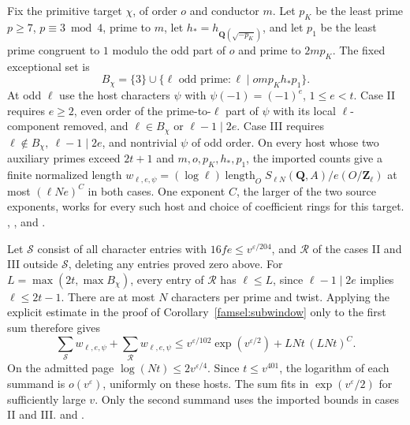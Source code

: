 Fix the primitive target \(\chi\), of order \(o\) and conductor \(m\).
Let \(p_K\) be the least prime \(p\ge7\), \(p\equiv3\bmod4\), prime
to \(m\), let \(h_* = h_{\mathbf Q(\sqrt{-p_K})}\), and let \(p_1\)
be the least prime congruent to \(1\) modulo the odd part of \(o\)
and prime to \(2mp_K\). The fixed exceptional set is
\[
 B_\chi=\{3\}\cup\{\ell\text{ odd prime}:\ell\mid om p_K h_*p_1\}.
\]
At odd \(\ell\) use the host characters \(\psi\) with
\(\psi(-1)=(-1)^e\), \(1\le e<t\). Case II requires \(e\ge2\), even
order of the prime-to-\(\ell\) part of \(\psi\) with its local
\(\ell\)-component removed, and
\(\ell\in B_\chi\) or \(\ell-1\mid2e\). Case III requires
\(\ell\notin B_\chi,\ \ell-1\mid2e\), and nontrivial \(\psi\) of
odd order. On every host whose two auxiliary primes exceed \(2t+1\)
and \(m,o,p_K,h_*,p_1\), the imported counts give a finite normalized
length \(w_{\ell,e,\psi}=(\log\ell)\operatorname{length}_O
S_{\ell N}(\mathbf Q,A)/e(O/\mathbf Z_\ell)\) at most
\((\ell N e)^{C}\) in both cases. One exponent \(C\), the larger of
the two source exponents, works for every such host and choice of
coefficient rings for this target.
,
, and
.

Let \(\mathcal S\) consist of all character entries with
\(16fe\le v^{\varepsilon/204}\), and \(\mathcal R\) of the cases II
and III outside \(\mathcal S\), deleting any entries proved zero
above. For \(L=\max(2t,\max B_\chi)\), every entry of \(\mathcal R\)
has \(\ell\le L\), since \(\ell-1\mid2e\) implies \(\ell\le2t-1\).
There are at most \(N\) characters per prime and twist. Applying the
explicit estimate in the proof of Corollary~\ref{famsel:subwindow}
only to the first sum therefore gives
\[
 \sum_{\mathcal S}w_{\ell,e,\psi}+\sum_{\mathcal R}w_{\ell,e,\psi}
 \le v^{\varepsilon/102}\exp(v^{\varepsilon/2})
       + LNt\,(LNt)^{C}.
\]
On the admitted page \(\log(Nt)\le 2v^{\varepsilon/4}\).
Since \(t\le v^{401}\), the logarithm of each summand is
\(o(v^\varepsilon)\), uniformly on these hosts. The sum fits in
\(\exp(v^\varepsilon/2)\) for sufficiently large \(v\).
Only the second summand uses the imported bounds in cases II and III.
 and
.

